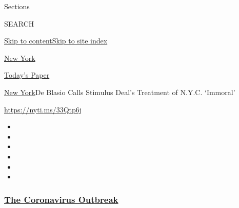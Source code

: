 Sections

SEARCH

\protect\hyperlink{site-content}{Skip to
content}\protect\hyperlink{site-index}{Skip to site index}

\href{https://www.nytimes3xbfgragh.onion/section/nyregion}{New York}

\href{https://myaccount.nytimes3xbfgragh.onion/auth/login?response_type=cookie\&client_id=vi}{}

\href{https://www.nytimes3xbfgragh.onion/section/todayspaper}{Today's
Paper}

\href{/section/nyregion}{New York}\textbar{}De Blasio Calls Stimulus
Deal's Treatment of N.Y.C. `Immoral'

\url{https://nyti.ms/33Qtp6j}

\begin{itemize}
\item
\item
\item
\item
\item
\item
\end{itemize}

\hypertarget{the-coronavirus-outbreak}{%
\subsubsection{\texorpdfstring{\href{https://www.nytimes3xbfgragh.onion/news-event/coronavirus?name=styln-coronavirus-national\&region=TOP_BANNER\&block=storyline_menu_recirc\&action=click\&pgtype=Article\&impression_id=dc0c94b0-f4c8-11ea-b54e-f5894ce1c108\&variant=undefined}{The
Coronavirus
Outbreak}}{The Coronavirus Outbreak}}\label{the-coronavirus-outbreak}}

